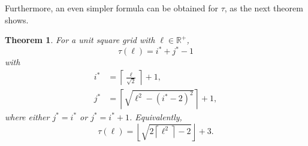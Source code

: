 \documentclass[12pt, a4paper]{article}
\newcommand{\funt}{\tau} %
\newcommand{\len}{\ell} %
\newcommand{\isoli}{i^\ast}
\newcommand{\jsoli}{j^\ast}
\newtheorem{theorem}{Theorem}%
\begin{document}
Furthermore, an even simpler formula can be obtained for $\funt$, as the next theorem shows.

\begin{theorem}
\label{theo: funt, sq, form}
For a unit square grid with $\len \in \mathbb R^+$,
\begin{equation}
\label{eq: theo: funt, sq, form; funt, with i, j}
\funt(\len) = \isoli+\jsoli-1
\end{equation}
with
\begin{align}
\label{eq: theo: funt, sq, form; i}
\isoli &= \left\lceil \frac{\len}{\sqrt{2}} \right\rceil + 1, \\
\label{eq: theo: funt, sq, form; j}
\jsoli &= \left\lceil \sqrt{\len^2-(\isoli-2)^2} \right\rceil + 1,
\end{align}
where either $\jsoli = \isoli$ or $\jsoli = \isoli+1$. Equivalently,
\begin{equation}
\label{eq: theo: funt, sq, form; funt, simpler}
\funt(\len) = \left\lfloor \sqrt{2 \left\lceil \len^2 \right\rceil - 2} \right\rfloor + 3.
\end{equation}
\end{theorem}
\end{document}
